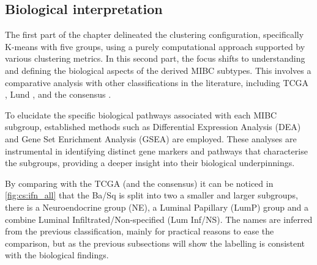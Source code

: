 \subsection{Biological interpretation} \label{s:cs:bio_interp}



The first part of the chapter delineated the clustering configuration, specifically K-means with five groups, using a purely computational approach supported by various clustering metrics. In this second part, the focus shifts to understanding and defining the biological aspects of the derived MIBC subtypes. This involves a comparative analysis with other classifications in the literature, including TCGA \cite{Robertson2017-mg}, Lund \citet{Marzouka2018-ge}, and the consensus \citet{Kamoun2020-tj}.

To elucidate the specific biological pathways associated with each MIBC subgroup, established methods such as Differential Expression Analysis (DEA) and Gene Set Enrichment Analysis (GSEA) are employed. These analyses are instrumental in identifying distinct gene markers and pathways that characterise the subgroups, providing a deeper insight into their biological underpinnings.


By comparing with the TCGA \citet{Robertson2017-mg} (and the consensus) it can be noticed in \cref{fig:cs:ifn_all} that the Ba/Sq is split into two a smaller and larger subgroups, there is a Neuroendocrine group (NE), a Luminal Papillary (LumP) group and a combine Luminal Infiltrated/Non-specified (Lum Inf/NS). The names are inferred from the previous classification, mainly for practical reasons to ease the comparison, but as the previous subsections will show the labelling is consistent with the biological findings.


